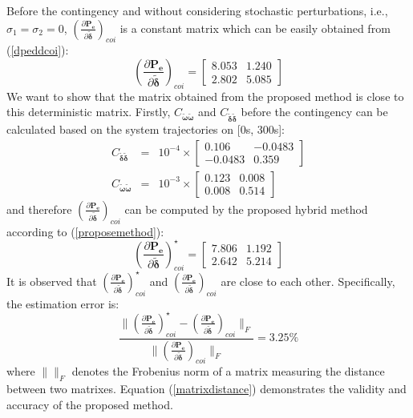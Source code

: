 \documentclass[journal]{IEEEtran}
\begin{document}
Before the contingency and without considering stochastic perturbations, i.e., $\sigma_1=\sigma_2=0$, $(\frac{\partial\bm{P_e}}{\partial\bm{\tilde{\delta}}})_{coi}$ is a constant matrix which can be easily obtained from (\ref{dpeddcoi}):
\begin{equation}
(\frac{\partial\bm{P_e}}{\partial\bm{\tilde{\delta}}})_{coi}=\left[ \begin{array}{cc} 8.053 & 1.240\\ 2.802 & 5.085\end{array}\right]\label{det_before}
\end{equation}
We want to show that the matrix obtained from the proposed method is close to this deterministic matrix. 
Firstly, $C_{\bm{\tilde{\omega}}{\bm{\tilde{\omega}}}}$ and $C_{\bm{\tilde{\delta}}{\bm{\tilde{\delta}}}}$ before the contingency can be calculated based on the system trajectories on [0s, 300s]:
\begin{eqnarray}
C_{\bm{\tilde{\delta}}{\bm{\tilde{\delta}}}}&=&10^{-4}\times\left[ \begin{array}{cc}  0.106 & -0.0483\\ -0.0483 &0.359\end{array}\right]\nonumber\\
C_{\bm{\tilde{\omega}}{\bm{\tilde{\omega}}}}&=&10^{-3}\times\left[ \begin{array}{cc}  0.123 & 0.008\\ 0.008 &0.514\end{array}\right]\nonumber
\end{eqnarray}
and therefore $(\frac{\partial\bm{P_e}}{\partial\bm{\tilde{\delta}}})_{coi}$ can be computed by the proposed hybrid method according to (\ref{proposemethod}):
\begin{equation}
(\frac{\partial\bm{P_e}}{\partial\bm{\tilde{\delta}}})_{coi}^{\star}=\left[ \begin{array}{cc} 7.806 & 1.192\\  2.642 &  5.214 \end{array}\right]
\end{equation}
It is observed that $(\frac{\partial\bm{P_e}}{\partial\bm{\tilde{\delta}}})_{coi}^{\star}$ and $(\frac{\partial\bm{P_e}}{\partial\bm{\tilde{\delta}}})_{coi}$ are close to each other. Specifically, the estimation error is:
\begin{equation}
\frac{\|(\frac{\partial\bm{P_e}}{\partial\bm{\tilde{\delta}}})_{coi}^\star-(\frac{\partial\bm{P_e}}{\partial\bm{\tilde{\delta}}})_{coi}\|_F}{\|(\frac{\partial\bm{P_e}}{\partial\bm{\tilde{\delta}}})_{coi}\|_F}=3.25\%\label{matrixdistance} \end{equation}
where $\|\|_F$ denotes the Frobenius norm of a matrix measuring the distance between two matrixes. Equation (\ref{matrixdistance}) demonstrates the validity and accuracy of the proposed method.
\end{document}
